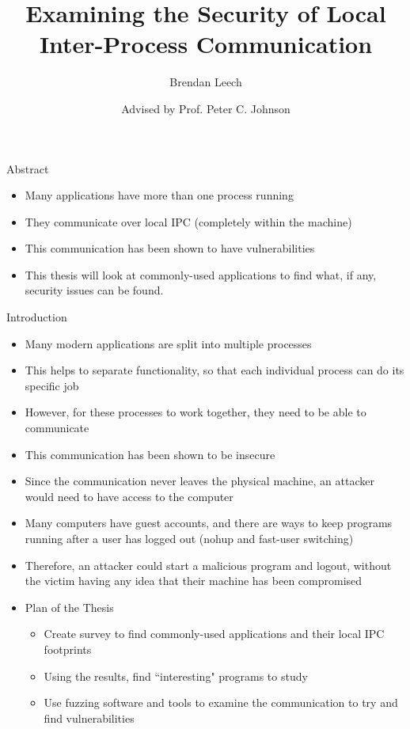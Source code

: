 \documentclass{article}
\title{Examining the Security of Local Inter-Process Communication}
\author{Brendan Leech}
\date{Advised by Prof. Peter C. Johnson}
\begin{document}
\maketitle

\begin{outline}
    \item {Abstract}
    \begin{itemize}
        \item {Many applications have more than one process running}
        \item {They communicate over local IPC (completely within the machine)}
        \item {This communication has been shown to have vulnerabilities}
        \item {This thesis will look at commonly-used applications to find what, if any, security issues can be found.}
    \end{itemize}
    \item {Introduction}
    \begin{itemize}
        \item {Many modern applications are split into multiple processes}
        \item {This helps to separate functionality, so that each individual process can do its specific job}
        \item {However, for these processes to work together, they need to be able to communicate}
        \item {This communication has been shown to be insecure}
        \item {Since the communication never leaves the physical machine, an attacker would need to have access to the computer}
        \item {Many computers have guest accounts, and there are ways to keep programs running after a user has logged out (nohup and fast-user switching)}
        \item {Therefore, an attacker could start a malicious program and logout, without the victim having any idea that their machine has been compromised}
        \item Plan of the Thesis
        \begin{itemize}
            \item Create survey to find commonly-used applications and their local IPC footprints
            \item Using the results, find ``interesting" programs to study
            \item Use fuzzing software and tools to examine the communication to try and find vulnerabilities

\end{itemize}
\end{itemize}
\end{outline}
\end{document}
